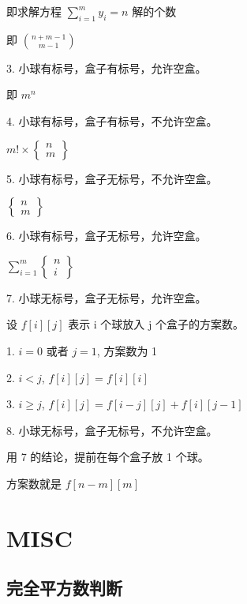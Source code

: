 \documentclass[a4paper]{article}
\begin{document}
   即求解方程 $\sum\limits_{i=1}^my_i=n$ 解的个数

   即 $\binom{n+m-1}{m-1}$

3. 小球有标号，盒子有标号，允许空盒。

   即 $m^n$

4. 小球有标号，盒子有标号，不允许空盒。

   $m!\times \begin{Bmatrix}n\\ m\end{Bmatrix}$

5. 小球有标号，盒子无标号，不允许空盒。

   $\begin{Bmatrix}n\\ m\end{Bmatrix}$

6. 小球有标号，盒子无标号，允许空盒。

   $\sum\limits_{i=1}^m\begin{Bmatrix}n\\ i\end{Bmatrix}$

7. 小球无标号，盒子无标号，允许空盒。

   设 $f[i][j]$ 表示 i 个球放入 j 个盒子的方案数。

   1. $i = 0$ 或者 $j = 1$, 方案数为 1

   2. $i < j$, $f[i][j]=f[i][i]$

   3. $i\ge j$, $f[i][j]=f[i-j][j]+f[i][j-1]$

8. 小球无标号，盒子无标号，不允许空盒。

   用 7 的结论，提前在每个盒子放 1 个球。

   方案数就是 $f[n-m][m]$
\section{MISC}
\subsection{完全平方数判断}

\end{document}
